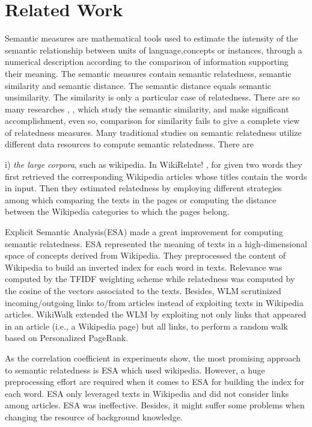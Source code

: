 \section{Related Work}
\label{related-word}
Semantic measures are mathematical tools used to estimate the intensity of the 
semantic relationship between units of language,concepts or instances, through 
a numerical description according to the comparison of information 
supporting their meaning. The semantic measures contain semantic relatedness,
semantic similarity and semantic distance. The semantic distance equals semantic 
unsimilarity. The similarity is only a particular case of relatedness.
There are so many researches \cite{acl/IacobacciPN15}, \cite{tkde/LiBM03}, \cite{tkde/ZhuI17}
which study the semantic similarity, and make significant accomplishment, even so,
comparison for similarity fails to give a complete view of relatedness measures.
Many traditional studies on semantic relatedness utilize different data resources
to compute semantic relatedness. There are

i) \emph{the large corpora}, such as wikipedia. 
In WikiRelate! \cite{aaai/StrubeP06}, for given two words
they first retrieved the corresponding Wikipedia articles whose titles
contain the words in input. Then they estimated relatedness by
employing different strategies among which comparing
the texts in the pages or computing the distance between
the Wikipedia categories to which the pages belong.

Explicit Semantic Analysis(ESA)\cite{ijcai/GabrilovichM07} made a great improvement for computing semantic relatedness. 
ESA represented the meaning of texts in a high-dimensional space of concepts derived from Wikipedia.
They preprocessed the content of Wikipedia to build an inverted index for each word in texts.
Relevance was computed by the TFIDF weighting scheme while relatedness was computed by
the cosine of the vectors associated to the texts.
Besides, WLM \cite{aaai/Milne08} scrutinized incoming/outgoing links to/from articles instead of
exploiting texts in Wikipedia articles.
WikiWalk \cite{textgraphs/YehRMAS09} extended the
WLM by exploiting not only links that appeared in an article (i.e., a Wikipedia page) but all 
links, to perform a random walk based on Personalized PageRank.

As the correlation coefficient in experiments show, the most promising approach to semantic relatedness
is ESA which used wikipedia. 
However, a huge preprocessing effort are required when it comes to ESA for building the index for each word.
ESA only leveraged texts in Wikipedia and did not consider links among articles. ESA was ineffective.
Besides, it might suffer some problems when changing the resource of background knowledge.

